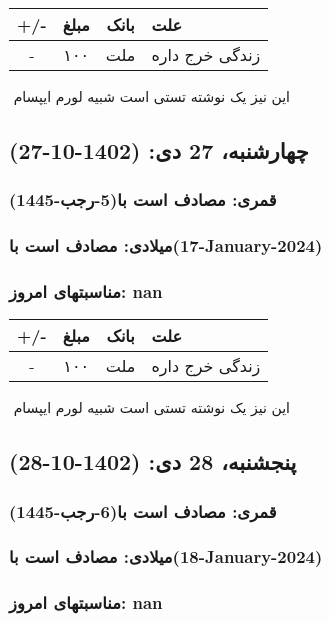 \documentclass{article}
\newcommand{\rnote}[1]{\marginpar{\textcolor{color}{\StrSubstitute{\##1}{ }{\_}}}}
\newcommand{\myRow}[4]{
    #1 & #2 & #3 & #4 \\ \hline
}
\begin{document}
\begin{tabular}{ | c | c | c | p{5cm} |}
    \hline
    \myRow{ +/- }{مبلغ}{بانک}{علت}
    \myRow{-}{۱۰۰}{ملت}{زندگی خرج داره}
\end{tabular}
\newline
\newline

‌
\rnote{تست}
این نیز یک نوشته تستی است شبیه لورم ایپسام




\newpage
{}
\textcolor{color}{
\section{ چهارشنبه، 27 دی: (1402-10-27) }
\subsubsection*{قمری: مصادف است با(5-رجب-1445)} 
\subsubsection*{میلادی: مصادف است با(17-January-2024)}
\subsubsection*{مناسبتهای امروز: nan}
}


\begin{tabular}{ | c | c | c | p{5cm} |}
    \hline
    \myRow{ +/- }{مبلغ}{بانک}{علت}
    \myRow{-}{۱۰۰}{ملت}{زندگی خرج داره}
\end{tabular}
\newline
\newline

‌
\rnote{تست}
این نیز یک نوشته تستی است شبیه لورم ایپسام




\newpage
{}
\textcolor{color}{
\section{ پنجشنبه، 28 دی: (1402-10-28) }
\subsubsection*{قمری: مصادف است با(6-رجب-1445)} 
\subsubsection*{میلادی: مصادف است با(18-January-2024)}
\subsubsection*{مناسبتهای امروز: nan}
}
\end{document}

